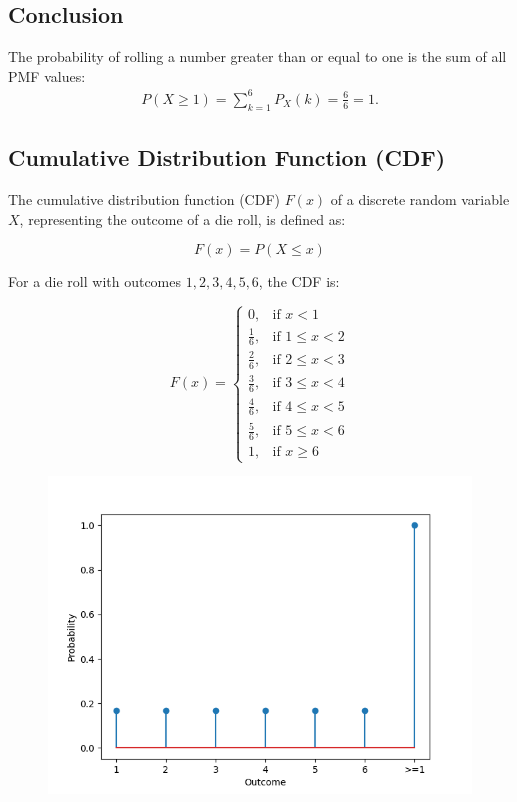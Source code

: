 \documentclass[journal]{IEEEtran}
\begin{document}
	\subsection*{Conclusion}
	The probability of rolling a number greater than or equal to one is the sum of all PMF values:
	\begin{align}
		P(X \geq 1) = \sum_{k=1}^{6} P_X(k) = \frac{6}{6} = 1.
	\end{align}
	\subsection*{Cumulative Distribution Function (CDF)}
	
	The cumulative distribution function (CDF) \(F(x)\) of a discrete random variable \(X\), representing the outcome of a die roll, is defined as:
	
	\[
	F(x) = P(X \leq x)
	\]
	
	For a die roll with outcomes \(1, 2, 3, 4, 5, 6\), the CDF is:
	
	\[
	F(x) =
	\begin{cases}
		0, & \text{if } x < 1 \\
		\frac{1}{6}, & \text{if } 1 \leq x < 2 \\
		\frac{2}{6}, & \text{if } 2 \leq x < 3 \\
		\frac{3}{6}, & \text{if } 3 \leq x < 4 \\
		\frac{4}{6}, & \text{if } 4 \leq x < 5 \\
		\frac{5}{6}, & \text{if } 5 \leq x < 6 \\
		1, & \text{if } x \geq 6
	\end{cases}
	\]
	
	\begin{figure}[h!]
		\centering
		\includegraphics[width=\columnwidth]{figs/Fig.png}
		\label{stemplot}
	\end{figure}
	
\end{document}
